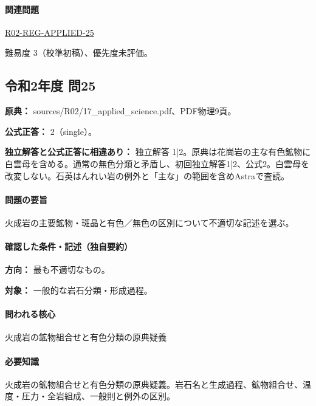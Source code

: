 \paragraph{関連問題} \hyperref[q:r02-reg-applied-25]{R02-REG-APPLIED-25}

\par 難易度 3（校準初稿）、優先度未評価。

\subsection{令和2年度 問25}
\label{q:r02-reg-applied-25}

\noindent\textbf{原典：} sources/R02/17\_applied\_science.pdf、PDF物理9頁。

\textbf{公式正答：} 2（single）。

\par\textbf{独立解答と公式正答に相違あり：} 独立解答 1|2。原典は花崗岩の主な有色鉱物に白雲母を含める。通常の無色分類と矛盾し、初回独立解答1|2、公式2。白雲母を改変しない。石英はんれい岩の例外と「主な」の範囲を含めAstraで査読。

\paragraph{問題の要旨} 火成岩の主要鉱物・斑晶と有色／無色の区別について不適切な記述を選ぶ。

\paragraph{確認した条件・記述（独自要約）}\mbox{}\par

\noindent\textbf{方向：} 最も不適切なもの。\par

\noindent\textbf{対象：} 一般的な岩石分類・形成過程。\par

\paragraph{問われる核心} 火成岩の鉱物組合せと有色分類の原典疑義

\paragraph{必要知識} 火成岩の鉱物組合せと有色分類の原典疑義。岩石名と生成過程、鉱物組合せ、温度・圧力・全岩組成、一般則と例外の区別。

